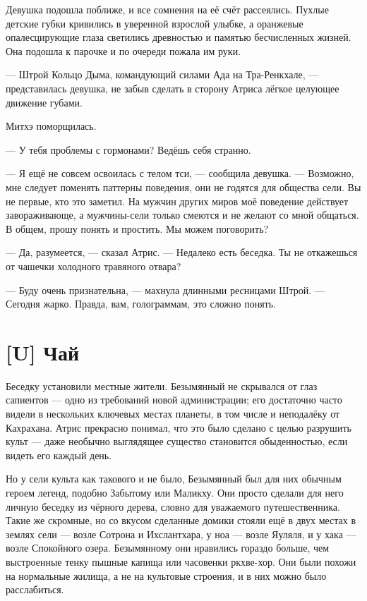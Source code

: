 Девушка подошла поближе, и все сомнения на её счёт рассеялись.
Пухлые детские губки кривились в уверенной взрослой улыбке, а оранжевые опалесцирующие глаза светились древностью и памятью бесчисленных жизней.
Она подошла к парочке и по очереди пожала им руки.

--- Штрой Кольцо Дыма, командующий силами Ада на Тра-Ренкхале, --- представилась девушка, не забыв сделать в сторону Атриса лёгкое целующее движение губами.

Митхэ поморщилась.

--- У тебя проблемы с гормонами?
Ведёшь себя странно.

--- Я ещё не совсем освоилась с телом тси, --- сообщила девушка.
--- Возможно, мне следует поменять паттерны поведения, они не годятся для общества сели.
Вы не первые, кто это заметил.
На мужчин других миров моё поведение действует завораживающе, а мужчины-сели только смеются и не желают со мной общаться.
В общем, прошу понять и простить.
Мы можем поговорить?

--- Да, разумеется, --- сказал Атрис.
--- Недалеко есть беседка.
Ты не откажешься от чашечки холодного травяного отвара?

--- Буду очень признательна, --- махнула длинными ресницами Штрой.
--- Сегодня жарко.
Правда, вам, голограммам, это сложно понять.

\section{[U] Чай}

Беседку установили местные жители.
Безымянный не скрывался от глаз сапиентов --- одно из требований новой администрации;
его достаточно часто видели в нескольких ключевых местах планеты, в том числе и неподалёку от Кахрахана.
Атрис прекрасно понимал, что это было сделано с целью разрушить культ --- даже необычно выглядящее существо становится обыденностью, если видеть его каждый день.

Но у сели культа как такового и не было, Безымянный был для них обычным героем легенд, подобно Забытому или Маликху.
Они просто сделали для него личную беседку из чёрного дерева, словно для уважаемого путешественника.
Такие же скромные, но со вкусом сделанные домики стояли ещё в двух местах в землях сели --- возле Сотрона и Ихслантхара, у ноа --- возле Яуляля, и у хака --- возле Спокойного озера.
Безымянному они нравились гораздо больше, чем выстроенные тенку пышные капища или часовенки ркхве-хор.
Они были похожи на нормальные жилища, а не на культовые строения, и в них можно было расслабиться.


